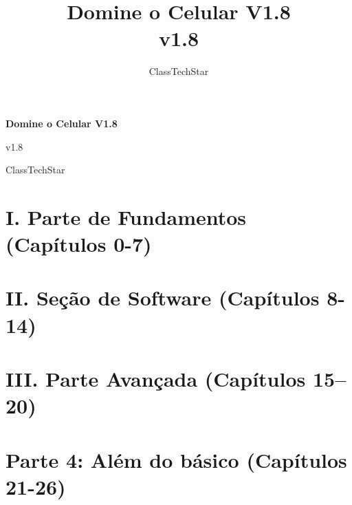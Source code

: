 \documentclass[11pt,a4paper,openany]{book}
\title{Domine o Celular V1.8\\ \large v1.8}
\author{ClassTechStar}
\date{}
\begin{document}
\begin{titlepage}
\centering
\vspace*{0.28\textheight}
{\Huge\bfseries Domine o Celular V1.8\par}
\vspace{1.2em}
{\Large v1.8\par}
\vfill
{\large ClassTechStar\par}
\end{titlepage}
\frontmatter
\tableofcontents
\mainmatter
\part*{I. Parte de Fundamentos (Capítulos 0-7)}










\part*{II. Seção de Software (Capítulos 8-14)}








\part*{III. Parte Avançada (Capítulos 15–20)}







\part*{Parte 4: Além do básico (Capítulos 21-26)}







\end{document}
